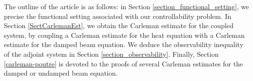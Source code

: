 \documentclass[a4paper, 12pt]{article}
\theoremstyle{plain}
\theoremstyle{definition}
\numberwithin{theorem}{section}
\numberwithin{equation}{section}
\begin{document}
\bigskip

\indent The outline of the article is as follows: in Section \ref{section_functional_setting}, we precise the functional setting associated with our controllability problem. In Section \ref{SectCarlemanEst}, we
obtain the Carleman estimate for the coupled system, by coupling a Carleman estimate for the heat equation with a Carleman estimate for the damped beam equation. We deduce the observability inequality of the adjoint system in Section \ref{section_observability}. Finally, Section \ref{carleman-poutre} is devoted to the proofs of several Carleman estimates for the damped or undamped beam equation.

\end{document}
